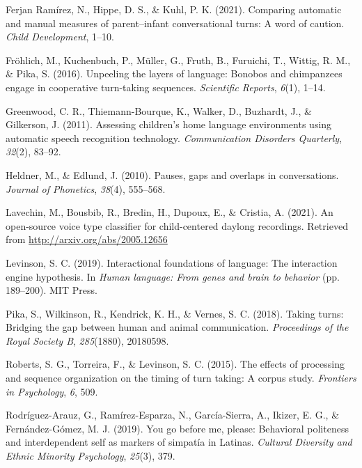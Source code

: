 \documentclass[10pt, letterpaper]{article}
\begin{document}
\leavevmode\hypertarget{ref-ferjan2021comparing}{}%
Ferjan Ramírez, N., Hippe, D. S., \& Kuhl, P. K. (2021). Comparing
automatic and manual measures of parent--infant conversational turns: A
word of caution. \emph{Child Development}, 1--10.

\leavevmode\hypertarget{ref-frohlich2016unpeeling}{}%
Fröhlich, M., Kuchenbuch, P., Müller, G., Fruth, B., Furuichi, T.,
Wittig, R. M., \& Pika, S. (2016). Unpeeling the layers of language:
Bonobos and chimpanzees engage in cooperative turn-taking sequences.
\emph{Scientific Reports}, \emph{6}(1), 1--14.

\leavevmode\hypertarget{ref-LENA}{}%
Greenwood, C. R., Thiemann-Bourque, K., Walker, D., Buzhardt, J., \&
Gilkerson, J. (2011). Assessing children's home language environments
using automatic speech recognition technology. \emph{Communication
Disorders Quarterly}, \emph{32}(2), 83--92.

\leavevmode\hypertarget{ref-heldner2010pauses}{}%
Heldner, M., \& Edlund, J. (2010). Pauses, gaps and overlaps in
conversations. \emph{Journal of Phonetics}, \emph{38}(4), 555--568.

\leavevmode\hypertarget{ref-lavechin2021vtc}{}%
Lavechin, M., Bousbib, R., Bredin, H., Dupoux, E., \& Cristia, A.
(2021). An open-source voice type classifier for child-centered daylong
recordings. Retrieved from \url{http://arxiv.org/abs/2005.12656}

\leavevmode\hypertarget{ref-levinson2019interactional}{}%
Levinson, S. C. (2019). Interactional foundations of language: The
interaction engine hypothesis. In \emph{Human language: From genes and
brain to behavior} (pp. 189--200). MIT Press.

\leavevmode\hypertarget{ref-pika2018taking}{}%
Pika, S., Wilkinson, R., Kendrick, K. H., \& Vernes, S. C. (2018).
Taking turns: Bridging the gap between human and animal communication.
\emph{Proceedings of the Royal Society B}, \emph{285}(1880), 20180598.

\leavevmode\hypertarget{ref-roberts2015effects}{}%
Roberts, S. G., Torreira, F., \& Levinson, S. C. (2015). The effects of
processing and sequence organization on the timing of turn taking: A
corpus study. \emph{Frontiers in Psychology}, \emph{6}, 509.

\leavevmode\hypertarget{ref-rodriguez2019you}{}%
Rodríguez-Arauz, G., Ramírez-Esparza, N., García-Sierra, A., Ikizer, E.
G., \& Fernández-Gómez, M. J. (2019). You go before me, please:
Behavioral politeness and interdependent self as markers of simpatía in
Latinas. \emph{Cultural Diversity and Ethnic Minority Psychology},
\emph{25}(3), 379.
\end{document}
